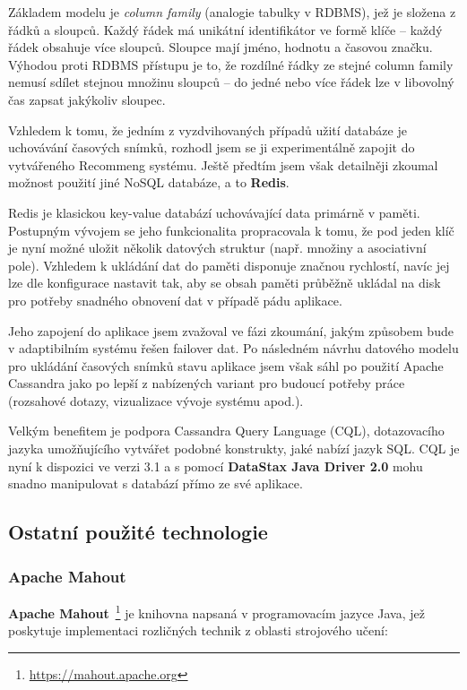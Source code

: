 \documentclass[thesis=M,czech]{FITthesis}[2014/05/07]
\begin{document}
Základem modelu je \emph{column family} (analogie tabulky v RDBMS), jež je složena z řádků a sloupců. Každý řádek má unikátní identifikátor ve formě klíče – každý řádek obsahuje více sloupců. Sloupce mají jméno, hodnotu a časovou značku. Výhodou proti RDBMS přístupu je to, že rozdílné řádky ze stejné column family nemusí sdílet stejnou množinu sloupců – do jedné nebo více řádek lze v libovolný čas zapsat jakýkoliv sloupec.

Vzhledem k tomu, že jedním z vyzdvihovaných případů užití databáze je uchovávání časových snímků, rozhodl jsem se ji experimentálně zapojit do vytvářeného Recommeng systému. Ještě předtím jsem však detailněji zkoumal možnost použití jiné NoSQL databáze, a to \textbf{Redis}. 

Redis je klasickou key-value databází uchovávající data primárně v paměti. Postupným vývojem se jeho funkcionalita propracovala k tomu, že pod jeden klíč je nyní možné uložit několik datových struktur (např. množiny a asociativní pole). Vzhledem k ukládání dat do paměti disponuje značnou rychlostí, navíc jej lze dle konfigurace nastavit tak, aby se obsah paměti průběžně ukládal na disk pro potřeby snadného obnovení dat v případě pádu aplikace.

Jeho zapojení do aplikace jsem zvažoval ve fázi zkoumání, jakým způsobem bude v adaptibilním systému řešen failover dat. Po následném návrhu datového modelu pro ukládání časových snímků stavu aplikace jsem však sáhl po použití Apache Cassandra jako po lepší z nabízených variant pro budoucí potřeby práce (rozsahové dotazy, vizualizace vývoje systému apod.). 

Velkým benefitem je podpora Cassandra Query Language (CQL), dotazovacího jazyka umožňujícího vytvářet podobné konstrukty, jaké nabízí jazyk SQL. CQL je nyní k dispozici ve verzi 3.1 a s pomocí \textbf{DataStax Java Driver 2.0} mohu snadno manipulovat s databází přímo ze své aplikace. 

\subsection{Ostatní použité technologie}

\subsubsection{Apache Mahout}
\textbf{Apache Mahout}~\footnote{\url{https://mahout.apache.org}} je knihovna napsaná v programovacím jazyce Java, jež poskytuje implementaci rozličných technik z oblasti strojového učení:
\end{document}
